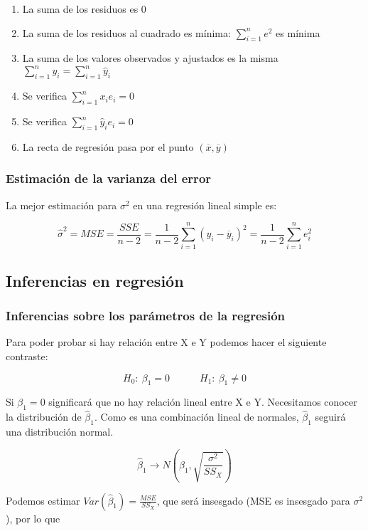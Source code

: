 \begin{enumerate}
    \item La suma de los residuos es 0
    \item La suma de los residuos al cuadrado es mínima: $\displaystyle\sum_{i=1}^{n}e^2$ es mínima
    \item La suma de los valores observados y ajustados es la misma $\displaystyle\sum_{i=1}^{n}y_i=\displaystyle\sum_{i=1}^{n}\hat y_i$
    \item Se verifica $\displaystyle\sum_{i=1}^{n}x_ie_i=0$
    \item Se verifica $\displaystyle\sum_{i=1}^{n}\hat{y}_ie_i=0$
    \item La recta de regresión pasa por el punto $(\overline{x},\overline{y})$
\end{enumerate}

\subsubsection{Estimación de la varianza del error}

La mejor estimación para $\sigma^2$ en una regresión lineal simple es:

$$
\hat\sigma^2=MSE=\frac{SSE}{n-2}=\frac{1}{n-2}\displaystyle\sum_{i=1}^{n}(y_i-\overline{y}_i)^2=\frac{1}{n-2}\displaystyle\sum_{i=1}^{n}e_i^2
$$

\subsection{Inferencias en regresión}
\subsubsection{Inferencias sobre los parámetros de la regresión}
Para poder probar si hay relación entre X e Y podemos hacer el siguiente contraste:

$$
H_0:\ \beta_1=0\quad\quad\quad H_1:\ \beta_1\neq0
$$

Si $\beta_1=0$ significará que no hay relación lineal entre X e Y. Necesitamos conocer la distribución de $\hat\beta_1$. Como es una combinación lineal de normales, $\hat\beta_1$ seguirá una distribución normal.

$$
\hat\beta_1\longrightarrow N\left(\beta_1, \sqrt{\frac{\sigma^2}{SS_X}}\right)
$$

Podemos estimar $Var(\hat\beta_1)=\frac{MSE}{SS_X}$, que será insesgado (MSE es insesgado para $\sigma^2$), por lo que 

